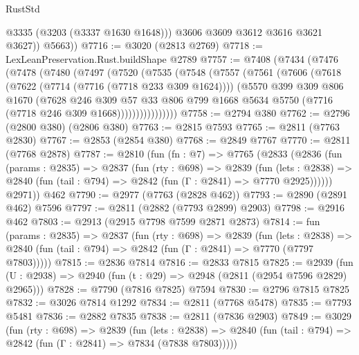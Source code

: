 \begin{lexlean}{RustStd}
\begin{coremodule}
{\begin{coremodule}
{{{{{{{{{{{{{{{              @3335
              (@3203 (@3337 @1630 @1648)))
            @3606
            @3609
            @3612
            @3616
            @3621
            @3627))
        @5663))
@7716 := @3020 (@2813 @2769)
@7718 := LexLeanPreservation.Rust.buildShape @2789
@7757 := @7408
    (@7434
      (@7476
        (@7478
          (@7480
            (@7497
              (@7520
                (@7535
                  (@7548
                    (@7557
                      (@7561
                        (@7606
                          (@7618
                            (@7622 (@7714 (@7716 (@7718 @233 @309 @1624))))
                            (@5570
                              @399
                              @309
                              @806
                              @1670
                              (@7628
                                @246
                                @309
                                @57
                                @33
                                @806
                                @799
                                @1668
                                @5634
                                @5750
                                (@7716 (@7718 @246 @309 @1668))))))))))))))))
@7758 := @2794 @380
@7762 := @2796 (@2800 @380) (@2806 @380)
@7763 := @2815 @7593
@7765 := @2811 (@7763 @2830)
@7767 := @2853 (@2854 @380)
@7768 := @2849 @7767
@7770 := @2811 (@7768 @2878)
@7787 := @2810
    (fun (fn : @7) =>
    @7765
      (@2833
        (@2836
          (fun (params : @2835) =>
          @2837
            (fun (rty : @698) =>
            @2839
              (fun (lets : @2838) =>
              @2840 (fun (tail : @794) => @2842 (fun (Γ : @2841) => @7770 @2925))))))
        @2971))
    @462
@7790 := @2977 (@7763 (@2828 @462))
@7793 := @2890 (@2891 @462) @7596
@7797 := @2811 (@2882 (@7793 @2899) @2903)
@7798 := @2916 @462
@7803 := @2913 (@2915 @7798 @7599 @2871 @2873)
@7814 := fun (params : @2835) =>
  @2837
    (fun (rty : @698) =>
    @2839
      (fun (lets : @2838) =>
      @2840 (fun (tail : @794) => @2842 (fun (Γ : @2841) => @7770 (@7797 @7803)))))
@7815 := @2836 @7814
@7816 := @2833 @7815
@7825 := @2939 (fun (U : @2938) => @2940 (fun (t : @29) => @2948 (@2811 (@2954 @7596 @2829) @2965)))
@7828 := @7790 (@7816 @7825) @7594
@7830 := @2796 @7815 @7825
@7832 := @3026 @7814 @1292
@7834 := @2811 (@7768 @5478)
@7835 := @7793 @5481
@7836 := @2882 @7835
@7838 := @2811 (@7836 @2903)
@7849 := @3029
    (fun (rty : @698) =>
    @2839
      (fun (lets : @2838) =>
      @2840 (fun (tail : @794) => @2842 (fun (Γ : @2841) => @7834 (@7838 @7803)))))
}}}}}}}}}}}}}}}
\end{coremodule}}
\end{coremodule}
\end{lexlean}
